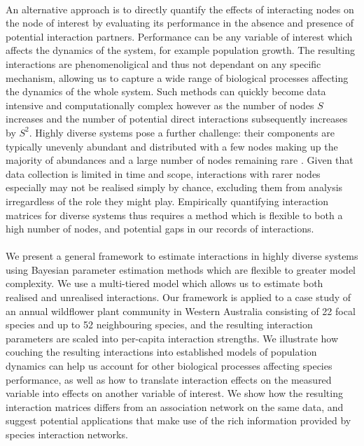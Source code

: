 \documentclass[a4,12pt]{article}
\begin{document}
    \paragraph{}
    An alternative approach is to directly quantify the effects of interacting nodes on the node of interest by evaluating its performance in the absence and presence of potential interaction partners. Performance can be any variable of interest which affects the dynamics of the system, for example population growth. The resulting interactions are phenomenoligical and thus not dependant on any specific mechanism, allowing us to capture a wide range of biological processes affecting the dynamics of the whole system. Such methods can quickly become data intensive and computationally complex however as the number of nodes $S$ increases and the number of potential direct interactions subsequently increases by $S^2$. Highly diverse systems pose a further challenge: their components are typically unevenly abundant and distributed with a few nodes making up the majority of abundances and a large number of nodes remaining rare \parencite{}. Given that data collection is limited in time and scope, interactions with rarer nodes especially may not be realised simply by chance, excluding them from analysis irregardless of the role they might play. Empirically quantifying interaction matrices for diverse systems thus requires a method which is flexible to both a high number of nodes, and potential gaps in our records of interactions. 


    \paragraph{} %
    We present a general framework to estimate interactions in highly diverse systems using Bayesian parameter estimation methods which are flexible to greater model complexity. We use a multi-tiered model which allows us to estimate both realised and unrealised interactions. Our framework is applied to a case study of an annual wildflower plant community in Western Australia consisting of 22 focal species and up to 52 neighbouring species, and the resulting interaction parameters are scaled into per-capita interaction strengths. We illustrate how couching the resulting interactions into established models of population dynamics can help us account for other biological processes affecting species performance, as well as how to translate interaction effects on the measured variable into effects on another variable of interest. We show how the resulting interaction matrices differs from an association network on the same data, and suggest potential applications that make use of the rich information provided by species interaction networks.
\end{document}
